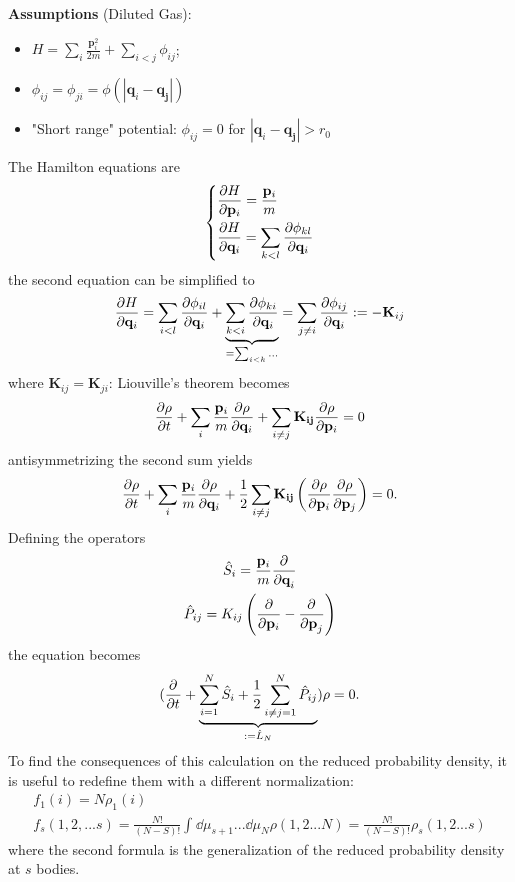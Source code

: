 \textbf{Assumptions} (Diluted Gas):
\begin{itemize}
    \item $H = \sum_{i}^{}\frac{\mathbf{p}_i^2}{2m} + \sum_{i<j}^{}\phi_{ij}$;
    \item $\phi_{ij} = \phi_{ji} = \phi(\left|\mathbf{q}_i-\mathbf{q_j}\right|)$
    \item "Short range" potential: $\phi_{ij} = 0$ for $\left|\mathbf{q}_i-
    \mathbf{q_j}\right|>r_0$
\end{itemize}
The Hamilton equations are
$$\begin{dcases*}
  \pdv{H}{\mathbf{p}_i} = \frac{\mathbf{p}_i}{m}\\
  \pdv{H}{\mathbf{q}_i} = \sum_{k<l}^{}\pdv{\phi_{kl}}{\mathbf{q}_i}
  \end{dcases*}$$
the second equation can be simplified to
$$\pdv{H}{\mathbf{q}_i} = \sum_{i<l}^{}\pdv{\phi_{il}}{\mathbf{q}_i} + 
\underbrace{\sum_{k<i}^{}\pdv{\phi_{ki}}{\mathbf{q}_i}}_{=\sum_{i<k}^{}...} = 
\sum_{j\neq i}^{} \pdv{\phi_{ij}}{\mathbf{q}_i} := -\mathbf{K}_{ij}$$
where $\mathbf{K}_{ij} = \mathbf{K}_{ji}$: Liouville's theorem becomes
$$\pdv{\rho}{t} + \sum_{i}^{}\frac{\mathbf{p}_i}{m}\pdv{\rho}{\mathbf{q}_i} + 
\sum_{i\neq j}^{}\mathbf{K_{ij}}\pdv{\rho}{\mathbf{p}_i}=0$$
antisymmetrizing the second sum yields
$$\pdv{\rho}{t} + \sum_{i}^{}\frac{\mathbf{p}_i}{m}\pdv{\rho}{\mathbf{q}_i} + 
\frac{1}{2}\sum_{i\neq j}^{}\mathbf{K_{ij}}\left(\pdv{\rho}{\mathbf{p}_i}
\pdv{\rho}{\mathbf{p}_j}\right)=0.$$
Defining the operators
\begin{gather*}
\hat S_i = \frac{\mathbf{p}_i}{m}\pdv[]{}{\mathbf{q}_i}\\
\hat P_{ij} = K_{ij}\left(\pdv{}{\mathbf{p}_i}-\pdv[]{}{\mathbf{p}_j}\right)\\
\end{gather*}
the equation becomes
$$(\pdv[]{}{t} + \underbrace{\sum_{i=1}^{N}\hat S_i +
\frac{1}{2}\sum_{i\neq j=1}^{N}\hat P_{ij}}_{:=\hat L_N})\rho=0.$$
To find the consequences of this calculation on the reduced probability density,
it is useful to redefine them with a different normalization:
\begin{gather*}
f_1(i) = N\rho_1(i)\\
f_s(1,2,...s) = \frac{N!}{(N-S)!}\int_{}^{}\dd\mu_{s+1}...\dd\mu_N\rho(1,2...N)=
\frac{N!}{(N-S)!}\rho_s(1,2...s)
\end{gather*}
where the second formula is the generalization of the reduced probability density
at $s$ bodies.

